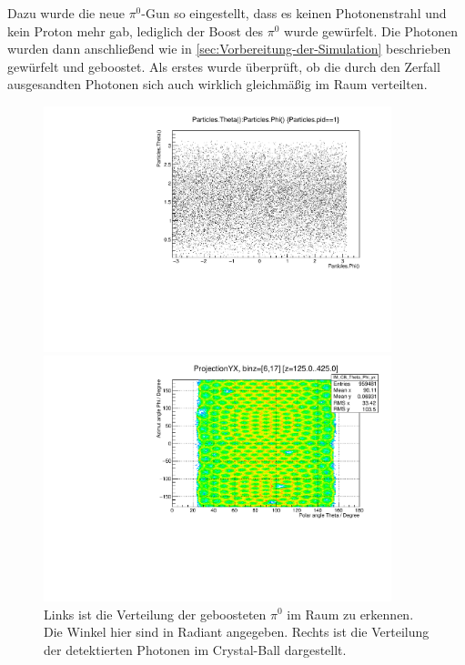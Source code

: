 \documentclass[a4paper,11pt,oneside,final,german,openbib,pdftex]{scrbook}
\begin{document}
{Dazu wurde die neue $\pi^0$-Gun so eingestellt, dass es keinen Photonenstrahl und kein Proton mehr gab, lediglich der Boost des $\pi^0$ wurde gewürfelt. Die Photonen wurden dann anschließend wie in \ref{sec:Vorbereitung-der-Simulation} beschrieben gewürfelt und geboostet. 
Als erstes wurde \"uberpr\"uft, ob die durch den Zerfall ausgesandten Photonen sich auch wirklich gleichm\"a{\ss}ig im Raum verteilten.


\begin{figure}[h!]
\centering
\begin{minipage}{0.45\textwidth}
\centering
		\includegraphics[width=0.9\textwidth]{20171005Pi0UrsprungThetaPhiVerteilung}
		
		\end{minipage}
	\hfill
	\begin{minipage}{0.45\textwidth}
		\centering
		\includegraphics[width=0.9\textwidth]{20171204DistributionPhotonUrsprungIsotrop}
	\end{minipage}
\caption{Links ist die Verteilung der geboosteten $\pi^0$ im Raum zu erkennen. Die Winkel hier sind in Radiant angegeben. Rechts ist die Verteilung der detektierten Photonen im Crystal-Ball dargestellt.}
\label{fig:Verteilung-von-Mesonen-und-Photonen-im-Raum}
\end{figure}

}
\end{document}
